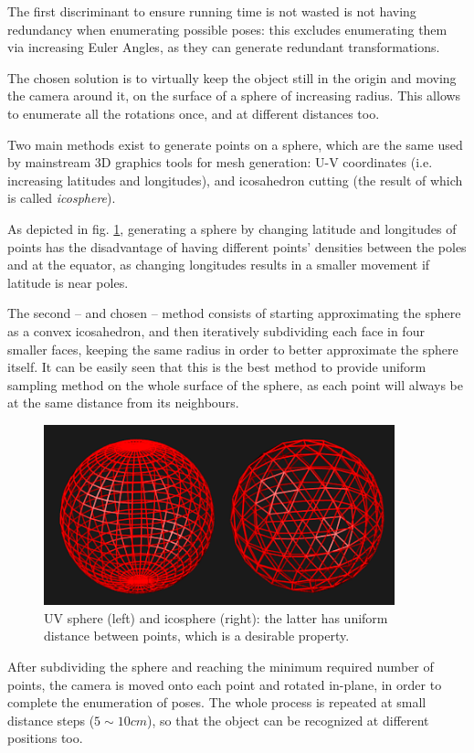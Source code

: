 The first discriminant to ensure running time is not wasted is not having
redundancy when enumerating possible poses: this excludes enumerating them via
increasing Euler Angles, as they can generate redundant transformations.

The chosen solution is to virtually keep the object still in the origin and
moving the camera around it, on the surface of a sphere of increasing radius.
This allows to enumerate all the rotations once, and at different distances too.

Two main methods exist to generate points on a sphere, which are the same
used by mainstream 3D graphics tools for mesh generation: U-V coordinates (i.e.
increasing latitudes and longitudes), and icosahedron cutting (the result of
which is called \emph{icosphere}). 

As depicted in fig. \ref{fig:uvsphere_vs_icosphere}, generating a sphere by changing latitude and longitudes of points has the 
disadvantage of having different points' densities between the poles and at the
equator, as changing longitudes results in a smaller movement if latitude is
near poles. 

The second -- and chosen -- method consists of starting approximating the sphere
as a convex icosahedron, and then iteratively subdividing each face in four
smaller faces, keeping the same radius in order to better approximate the sphere
itself. It can be easily seen that this is the best method to provide uniform
sampling method on the whole surface of the sphere, as each point will always be
at the same distance from its neighbours. 

\begin{figure}[htbp]
\centering
\includegraphics[width=4in]{./Graphics/uvsphere_vs_icosphere}
\caption{UV sphere (left) and icosphere (right): the latter has uniform distance
between points, which is a desirable property. \label{fig:uvsphere_vs_icosphere}}
\end{figure}

After subdividing the sphere and reaching the minimum required number of points,
the camera is moved onto each point and rotated in-plane, in order to complete
the enumeration of poses. The whole process is repeated at small distance steps
($5\sim10\unit{cm}$), so that the object can be recognized at different positions too.

